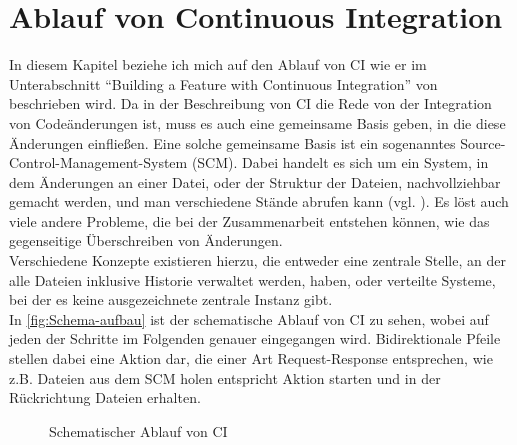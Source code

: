 \section{Ablauf von Continuous Integration}
In diesem Kapitel beziehe ich mich auf den Ablauf von CI wie er im Unterabschnitt "`Building a Feature with Continuous Integration"' von \cite{fowler-CI} beschrieben wird.
Da in der Beschreibung von CI die Rede von der Integration von Codeänderungen ist, muss es auch eine gemeinsame Basis geben, in die diese Änderungen einfließen. Eine solche gemeinsame Basis ist ein sogenanntes Source-Control-Management-System (SCM). Dabei handelt es sich um ein System, in dem Änderungen an einer Datei, oder der Struktur der Dateien, nachvollziehbar gemacht werden, und man verschiedene Stände abrufen kann (vgl. \cite{fowler-CI}). 
Es löst auch viele andere Probleme, die bei der Zusammenarbeit entstehen können, wie das gegenseitige Überschreiben von Änderungen. \\
Verschiedene Konzepte existieren hierzu, die entweder eine zentrale Stelle, an der alle Dateien inklusive Historie verwaltet werden, haben, oder verteilte Systeme, bei der es keine ausgezeichnete zentrale Instanz gibt.\\
In \autoref{fig:Schema-aufbau} ist der schematische Ablauf von CI zu sehen, wobei auf jeden der Schritte im Folgenden genauer eingegangen wird. Bidirektionale Pfeile stellen dabei eine Aktion dar, die einer Art Request-Response entsprechen, wie z.B. Dateien aus dem SCM holen entspricht Aktion starten und in der Rückrichtung Dateien erhalten.
\begin{figure}[h]
  \centering
  \caption{Schematischer Ablauf von CI}\label{fig:Schema-aufbau}
\end{figure}

